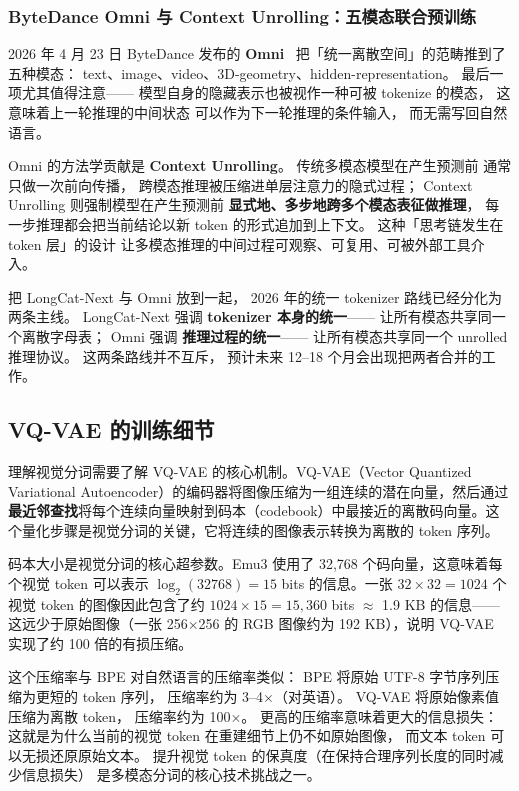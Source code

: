 \subsubsection{ByteDance Omni 与 Context Unrolling：五模态联合预训练}

2026 年 4 月 23 日 ByteDance 发布的 \textbf{Omni}~\cite{bytedance2026omni}
把「统一离散空间」的范畴推到了五种模态：
text、image、video、3D-geometry、hidden-representation。
最后一项尤其值得注意——
模型自身的隐藏表示也被视作一种可被 tokenize 的模态，
这意味着上一轮推理的中间状态
可以作为下一轮推理的条件输入，
而无需写回自然语言。

Omni 的方法学贡献是 \textbf{Context Unrolling}。
传统多模态模型在产生预测前
通常只做一次前向传播，
跨模态推理被压缩进单层注意力的隐式过程；
Context Unrolling 则强制模型在产生预测前
\textbf{显式地、多步地跨多个模态表征做推理}，
每一步推理都会把当前结论以新 token 的形式追加到上下文。
这种「思考链发生在 token 层」的设计
让多模态推理的中间过程可观察、可复用、可被外部工具介入。

把 LongCat-Next 与 Omni 放到一起，
2026 年的统一 tokenizer 路线已经分化为两条主线。
LongCat-Next 强调
\textbf{tokenizer 本身的统一}——
让所有模态共享同一个离散字母表；
Omni 强调
\textbf{推理过程的统一}——
让所有模态共享同一个 unrolled 推理协议。
这两条路线并不互斥，
预计未来 12--18 个月会出现把两者合并的工作。

\subsection{VQ-VAE 的训练细节}

理解视觉分词需要了解 VQ-VAE 的核心机制。VQ-VAE（Vector Quantized Variational Autoencoder）的编码器将图像压缩为一组连续的潜在向量，然后通过\textbf{最近邻查找}将每个连续向量映射到码本（codebook）中最接近的离散码向量。这个量化步骤是视觉分词的关键，它将连续的图像表示转换为离散的 token 序列。

码本大小是视觉分词的核心超参数。Emu3 使用了 32,768 个码向量，这意味着每个视觉 token 可以表示 $\log_2(32768) = 15$ bits 的信息。一张 $32 \times 32 = 1024$ 个视觉 token 的图像因此包含了约 $1024 \times 15 = 15{,}360$ bits $\approx$ 1.9 KB 的信息——这远少于原始图像（一张 256$\times$256 的 RGB 图像约为 192 KB），说明 VQ-VAE 实现了约 100 倍的有损压缩。

这个压缩率与 BPE 对自然语言的压缩率类似：
BPE 将原始 UTF-8 字节序列压缩为更短的 token 序列，
压缩率约为 3--4$\times$（对英语）。
VQ-VAE 将原始像素值压缩为离散 token，
压缩率约为 100$\times$。
更高的压缩率意味着更大的信息损失：
这就是为什么当前的视觉 token 在重建细节上仍不如原始图像，
而文本 token 可以无损还原原始文本。
提升视觉 token 的保真度（在保持合理序列长度的同时减少信息损失）
是多模态分词的核心技术挑战之一。

